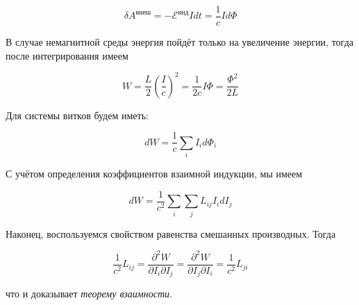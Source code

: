 \begin{equation}
    \delta A^\text{внеш} = - \mathcal{E}^\text{инд} I dt = \frac{1}{c} I d \Phi
\end{equation}

\noindent
В случае немагнитной среды энергия пойдёт только на увеличение энергии, тогда после интегрирования имеем

\begin{equation}
    W = \frac{L}{2} \left( \frac{I}{c} \right)^2 = \frac{1}{2 c} I \Phi = \frac{\Phi^2}{2 L}
\end{equation}

\noindent
Для системы витков будем иметь:

\begin{equation*}
    dW = \frac{1}{c} \sum_i I_i d \Phi_i
\end{equation*}

\noindent
С учётом определения коэффициентов взаимной индукции, мы имеем

\begin{equation}
    dW = \frac{1}{c^2} \sum_i \sum_j L_{i j} I_i dI_j
\end{equation}

\noindent
Наконец, воспользуемся свойством равенства смешанных производных. Тогда

\begin{equation}
    \frac{1}{c^2} L_{i j} = \frac{\partial^2 W}{\partial I_i \partial I_j} = \frac{\partial^2 W}{\partial I_j \partial I_i} = \frac{1}{c^2} L_{j i}
\end{equation}

\noindent
что и доказывает \textit{теорему взаимности}.